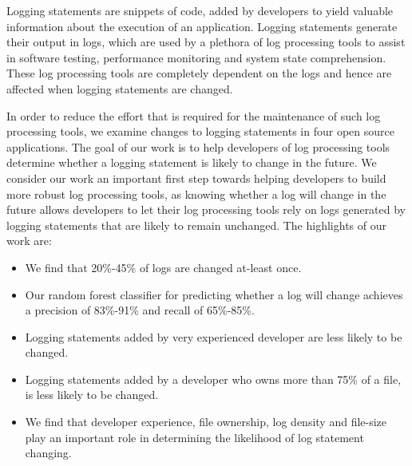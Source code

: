 Logging statements are snippets of code, added by developers to yield valuable information about the execution of an application. Logging statements generate their output in logs, which are used by a plethora of log processing tools to assist in software testing, performance monitoring and system state comprehension. These log processing tools are completely dependent on the logs and hence are affected when logging statements are changed.

In order to reduce the effort that is required for the maintenance of such log processing tools, we examine changes to logging statements in four open source applications. The goal of our work is to help developers of log processing tools determine whether a logging statement is likely to change in the future. We consider our work an important first step towards helping developers to build more robust log processing tools, as knowing whether a log will change in the future allows developers to let their log processing tools rely on logs generated by logging statements that are likely to remain unchanged. The highlights of our work are:


\begin{itemize}
	\item We find that 20\%-45\% of logs are changed at-least once.
	\item Our random forest classifier for predicting whether a log will change achieves a precision of 83\%-91\% and recall of 65\%-85\%. 
	\item Logging statements added by very experienced developer are less likely to be changed.
	\item Logging statements added by a developer who owns more than 75\% of a file, is less likely to be changed. 
	\item We find that developer experience, file ownership, log density and file-size play an important role in determining the likelihood of log statement changing.
	
	
\end{itemize}

